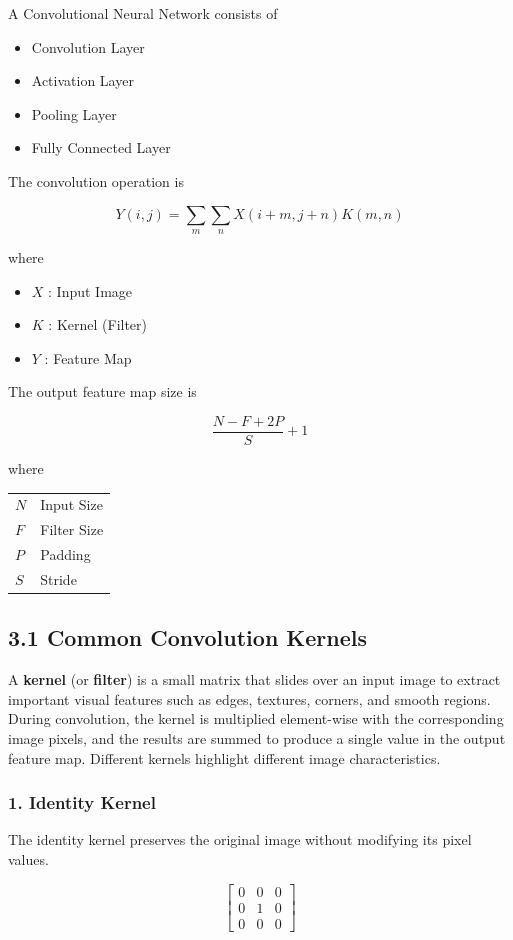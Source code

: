 \documentclass[11pt]{article}
\begin{document}
A Convolutional Neural Network consists of

\begin{itemize}
\item Convolution Layer
\item Activation Layer
\item Pooling Layer
\item Fully Connected Layer
\end{itemize}

The convolution operation is

\[
Y(i,j)=\sum_m\sum_n X(i+m,j+n)K(m,n)
\]

where

\begin{itemize}
\item $X$ : Input Image
\item $K$ : Kernel (Filter)
\item $Y$ : Feature Map
\end{itemize}

The output feature map size is

\[
\frac{N-F+2P}{S}+1
\]

where

\begin{tabular}{ll}
$N$ & Input Size\\
$F$ & Filter Size\\
$P$ & Padding\\
$S$ & Stride
\end{tabular}
\subsection*{3.1 Common Convolution Kernels}

A \textbf{kernel} (or \textbf{filter}) is a small matrix that slides over an input image to extract important visual features such as edges, textures, corners, and smooth regions. During convolution, the kernel is multiplied element-wise with the corresponding image pixels, and the results are summed to produce a single value in the output feature map. Different kernels highlight different image characteristics.

\subsubsection*{1. Identity Kernel}

The identity kernel preserves the original image without modifying its pixel values.

\[
\begin{bmatrix}
0 & 0 & 0\\
0 & 1 & 0\\
0 & 0 & 0
\end{bmatrix}
\]
\end{document}

